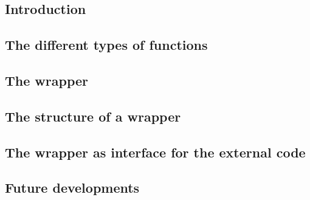 \label{library_wrapper}

\subsection{Introduction}

\cleardoublepage

\subsection{The different types of functions}

\cleardoublepage

\subsection{The wrapper}

\cleardoublepage

\subsection{The structure of a wrapper}

\cleardoublepage

\subsection{The wrapper as interface for the external code}

\cleardoublepage

\subsection{Future developments}

\cleardoublepage
